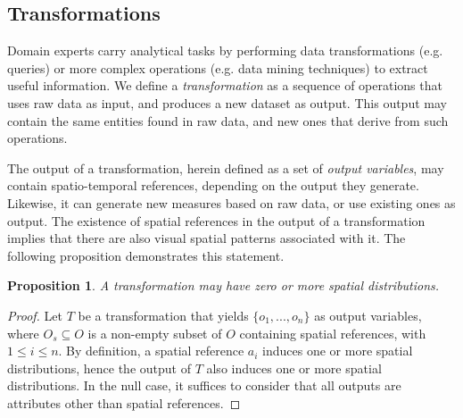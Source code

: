 \documentclass[]{interact}
\theoremstyle{plain}%
\newtheorem{proposition}[theorem]{Proposition}
\theoremstyle{definition}
\theoremstyle{remark}
\theoremstyle{definition}
\begin{document}
\subsection{Transformations}\label{sec:analyzer}

Domain experts carry analytical tasks by performing data transformations (e.g. queries) or more complex operations (e.g. data mining techniques) to extract useful information. We define a \emph{transformation} as a sequence of operations that uses raw data as input, and produces a new dataset as output. This output may contain the same entities found in raw data, and new ones that derive from such operations.



The output of a transformation, herein defined as a set of \emph{output variables}, may contain spatio-temporal references, depending on the output they generate. Likewise, it can generate new measures based on raw data, or use existing ones as output. The existence of spatial references in the output of a transformation implies that there are also visual spatial patterns associated with it. 
The following proposition demonstrates this statement.

\begin{proposition}
A \textit{transformation} may have zero or more spatial distributions.
\end{proposition}
\begin{proof}
	 Let $T$ be a transformation that yields $\{o_1,...,o_n\}$ as output variables, where $O_s \subseteq O$ is a non-empty subset of $O$ containing spatial references, with $1 \leq i \leq n$. By definition, a spatial reference $a_i$ induces one or more spatial distributions, hence the output of $T$ also induces one or more spatial distributions. In the null case, it suffices to consider that all outputs are attributes other than spatial references.
\end{proof}
\end{document}
